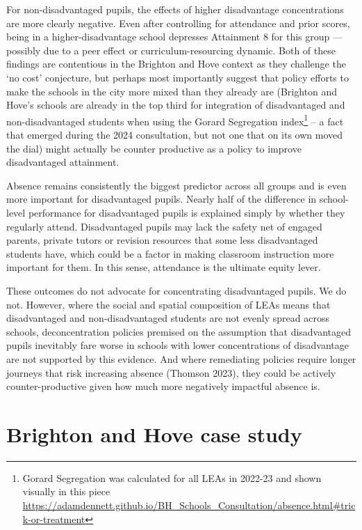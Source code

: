 \documentclass[
  12pt,
  titlepage]{article}
\begin{document}
For non-disadvantaged pupils, the effects of higher disadvantage
concentrations are more clearly negative. Even after controlling for
attendance and prior scores, being in a higher-disadvantage school
depresses Attainment 8 for this group --- possibly due to a peer effect
or curriculum-resourcing dynamic. Both of these findings are contentious
in the Brighton and Hove context as they challenge the `no cost'
conjecture, but perhaps most importantly suggest that policy efforts to
make the schools in the city more mixed than they already are (Brighton
and Hove's schools are already in the top third for integration of
disadvantaged and non-disadvantaged students when using the Gorard
Segregation index\footnote{Gorard Segregation was calculated for all
  LEAs in 2022-23 and shown visually in this piece
  \url{https://adamdennett.github.io/BH_Schools_Consultation/absence.html\#trick-or-treatment}}
-- a fact that emerged during the 2024 consultation, but not one that on
its own moved the dial) might actually be counter productive as a policy
to improve disadvantaged attainment.

Absence remains consistently the biggest predictor across all groups and
is even more important for disadvantaged pupils. Nearly half of the
difference in school-level performance for disadvantaged pupils is
explained simply by whether they regularly attend. Disadvantaged pupils
may lack the safety net of engaged parents, private tutors or revision
resources that some less disadvantaged students have, which could be a
factor in making classroom instruction more important for them. In this
sense, attendance is the ultimate equity lever.

These outcomes do not advocate for concentrating disadvantaged pupils.
We do not. However, where the social and spatial composition of LEAs
means that disadvantaged and non-disadvantaged students are not evenly
spread across schools, deconcentration policies premised on the
assumption that disadvantaged pupils inevitably fare worse in schools
with lower concentrations of disadvantage are not supported by this
evidence. And where remediating policies require longer journeys that
risk increasing absence (Thomson 2023), they could be actively
counter-productive given how much more negatively impactful absence is.

\section{Brighton and Hove case
study}\label{brighton-and-hove-case-study}
\end{document}
